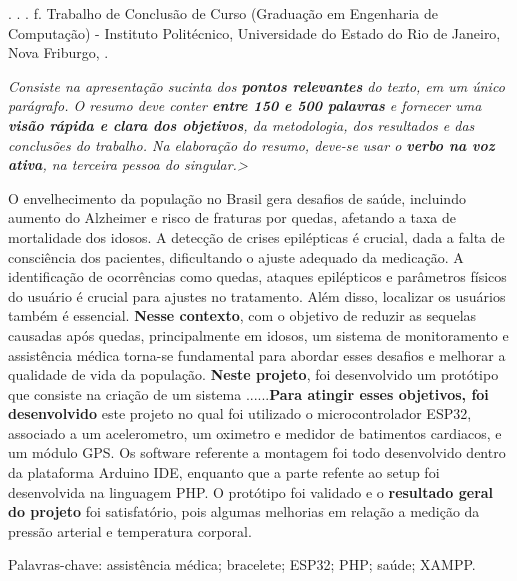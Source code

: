 \begin{resumo}
\begin{SingleSpace}

\noindent
\begin{flushleft}
\entradaAutor{}. \textit{\imprimirtitulo}. \the\year. \pageref{LastPage} f. Trabalho de Conclusão de Curso (Graduação em Engenharia de Computação) - Instituto Politécnico, Universidade do Estado do Rio de Janeiro, Nova Friburgo, \the\year.
\end{flushleft}
\vspace{\onelineskip}

\setlength{\parindent}{1.3cm}

\textit{Consiste na apresentação sucinta dos \textbf{pontos relevantes} do texto, em um único parágrafo. O resumo deve conter\textbf{ entre 150 e 500 palavras} e fornecer uma\textbf{ visão rápida e clara dos objetivos}, da metodologia, dos resultados e das conclusões do trabalho. Na elaboração do resumo, deve-se usar o \textbf{verbo na voz ativa}, na terceira pessoa do singular.>
}

\vspace{0.5cm}
O envelhecimento da população no Brasil gera desafios de saúde, incluindo aumento do Alzheimer e risco de fraturas por quedas, afetando a taxa de mortalidade dos idosos. A detecção de crises epilépticas é crucial, dada a falta de consciência dos pacientes, dificultando o ajuste adequado da medicação. A identificação de ocorrências como quedas, ataques epilépticos e parâmetros físicos do usuário é crucial para ajustes no tratamento. Além disso, localizar os usuários também é essencial. \textbf{Nesse contexto}, com o objetivo de reduzir as sequelas causadas após quedas, principalmente em idosos, um sistema de monitoramento e assistência médica torna-se fundamental para abordar esses desafios e melhorar a qualidade de vida da população.  \textbf{Neste projeto}, foi desenvolvido um protótipo que consiste na criação de um sistema ......\textbf{Para atingir esses objetivos, foi desenvolvido} este projeto no qual foi utilizado o microcontrolador ESP32, associado a um acelerometro, um oximetro e medidor de batimentos cardiacos, e um módulo GPS. Os software referente a montagem foi todo desenvolvido dentro da plataforma Arduino IDE, enquanto que a parte refente ao setup foi desenvolvida na linguagem PHP. O protótipo foi validado e o \textbf{resultado geral do projeto} foi satisfatório, pois algumas melhorias em relação a medição da pressão arterial e temperatura corporal.
 

\vspace{\onelineskip}
\noindent Palavras-chave:  assistência médica; bracelete; ESP32; PHP; saúde; XAMPP.

\end{SingleSpace}
\end{resumo}